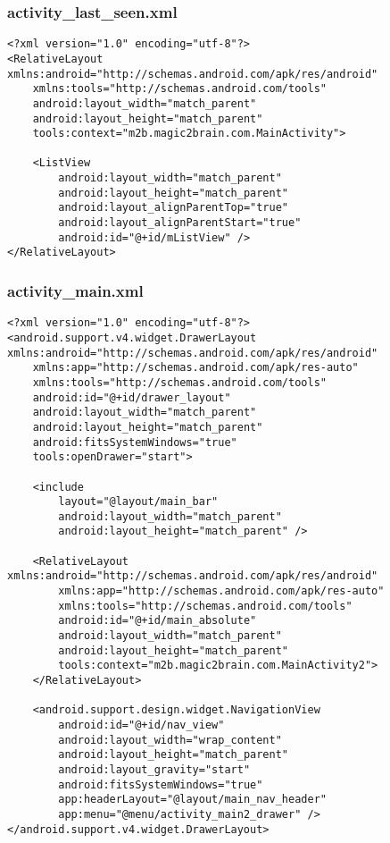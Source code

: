 \subsubsection{activity\_last\_seen.xml}
\begin{lstlisting}
<?xml version="1.0" encoding="utf-8"?>
<RelativeLayout xmlns:android="http://schemas.android.com/apk/res/android"
    xmlns:tools="http://schemas.android.com/tools"
    android:layout_width="match_parent"
    android:layout_height="match_parent"
    tools:context="m2b.magic2brain.com.MainActivity">

    <ListView
        android:layout_width="match_parent"
        android:layout_height="match_parent"
        android:layout_alignParentTop="true"
        android:layout_alignParentStart="true"
        android:id="@+id/mListView" />
</RelativeLayout>
\end{lstlisting}

\subsubsection{activity\_main.xml}
\begin{lstlisting}
<?xml version="1.0" encoding="utf-8"?>
<android.support.v4.widget.DrawerLayout xmlns:android="http://schemas.android.com/apk/res/android"
    xmlns:app="http://schemas.android.com/apk/res-auto"
    xmlns:tools="http://schemas.android.com/tools"
    android:id="@+id/drawer_layout"
    android:layout_width="match_parent"
    android:layout_height="match_parent"
    android:fitsSystemWindows="true"
    tools:openDrawer="start">

    <include
        layout="@layout/main_bar"
        android:layout_width="match_parent"
        android:layout_height="match_parent" />

    <RelativeLayout xmlns:android="http://schemas.android.com/apk/res/android"
        xmlns:app="http://schemas.android.com/apk/res-auto"
        xmlns:tools="http://schemas.android.com/tools"
        android:id="@+id/main_absolute"
        android:layout_width="match_parent"
        android:layout_height="match_parent"
        tools:context="m2b.magic2brain.com.MainActivity2">
    </RelativeLayout>

    <android.support.design.widget.NavigationView
        android:id="@+id/nav_view"
        android:layout_width="wrap_content"
        android:layout_height="match_parent"
        android:layout_gravity="start"
        android:fitsSystemWindows="true"
        app:headerLayout="@layout/main_nav_header"
        app:menu="@menu/activity_main2_drawer" />
</android.support.v4.widget.DrawerLayout>
\end{lstlisting}

